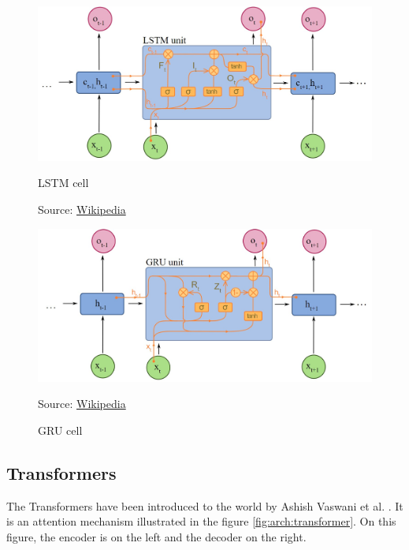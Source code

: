 \documentclass[12pt]{report}
\begin{document}
\begin{figure}[htbp]
   \begin{minipage}{0.5\textwidth}
     \centering
     \includegraphics[width=.98\linewidth]{images/nn/layers/lstm.jpg}
     \caption{LSTM cell}
     Source: \href{https://commons.wikimedia.org/wiki/File:Long_Short-Term_Memory.svg}{Wikipedia}
     \label{fig:lstm}
   \end{minipage}\hfill
   \begin{minipage}{0.5\textwidth}
     \centering
     \includegraphics[width=.98\linewidth]{images/nn/layers/gru.jpg}
     \caption{GRU cell}
     Source: \href{https://en.wikipedia.org/wiki/Recurrent_neural_network#/media/File:Gated_Recurrent_Unit.svg}{Wikipedia}
     \label{fig:gru}
   \end{minipage}
\end{figure}


\subsection{Transformers}
\label{sec:back:transformers}

The Transformers \cite{vaswani_attention_2017, noauthor_transformer_nodate, giacaglia_transformers_2019, allard_what_2020, alammar_illustrated_nodate} have been introduced to the world by Ashish Vaswani et al. \cite{vaswani_attention_2017-1}.
It is an attention mechanism illustrated in the figure \ref{fig:arch:transformer}.
On this figure, the encoder is on the left and the decoder on the right.
\end{document}
